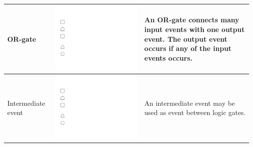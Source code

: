 \begin{table}[!h]
\begin{tabularx}{\linewidth}{ |l|m{1.35cm}|X| }
    \hline
    OR-gate & \includegraphics[keepaspectratio=true,scale=0.8] {images/fault-tree-or-gate.pdf} & An OR-gate connects many input events with one output event. The output event occurs if any of the input events occurs. \\
    \hline
    Intermediate event & \includegraphics[keepaspectratio=true,scale=0.8] {images/fault-tree-intermediate-event.pdf} & An intermediate event may be used as event between logic gates.\\
    \hline

\end{tabularx}
\end{table}
